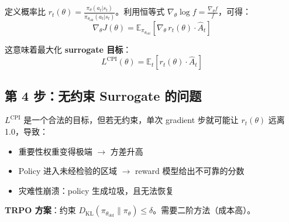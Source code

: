 定义概率比 $r_t(\theta) = \frac{\pi_\theta(a_t|s_t)}{\pi_{\theta_{\text{old}}}(a_t|s_t)}$。利用恒等式 $\nabla_\theta \log f = \frac{\nabla_\theta f}{f}$，可得：
\begin{equation}
\nabla_\theta J(\theta) = \mathbb{E}_{\pi_{\theta_{\text{old}}}}\left[\nabla_\theta\, r_t(\theta) \cdot \hat{A}_t\right]
\end{equation}

这意味着最大化\textbf{ surrogate 目标}：
\begin{equation}
L^{\text{CPI}}(\theta) = \mathbb{E}_t\left[r_t(\theta) \cdot \hat{A}_t\right]
\end{equation}

\subsection{第 4 步：无约束 Surrogate 的问题}
\label{step-4-the-problem-with-unconstrained-surrogates}

$L^{\text{CPI}}$ 是一个合法的目标，但若无约束，单次 gradient 步就可能让 $r_t(\theta)$ 远离 1.0，导致：

\begin{itemize}
  \item 重要性权重变得极端 $\rightarrow$ 方差升高
  \item Policy 进入未经检验的区域 $\rightarrow$ reward 模型给出不可靠的分数
  \item 灾难性崩溃：policy 生成垃圾，且无法恢复
\end{itemize}

\textbf{TRPO 方案}：约束 $D_{\text{KL}}(\pi_{\theta_{\text{old}}} \| \pi_\theta) \leq \delta$。需要二阶方法（成本高）。

